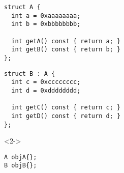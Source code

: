 \begin{frame}[fragile]
\begin{noteblock}{}
\begin{twocols}
\begin{lstlisting}[basicstyle=\scriptsize]
struct A {
  int a = 0xaaaaaaaa;
  int b = 0xbbbbbbbb;

  int getA() const { return a; }
  int getB() const { return b; }
};
\end{lstlisting}
\twocolssep
\begin{lstlisting}[basicstyle=\scriptsize]
struct B : A {
  int c = 0xcccccccc;
  int d = 0xdddddddd;

  int getC() const { return c; }
  int getD() const { return d; }
};
\end{lstlisting}
\end{twocols}
\end{noteblock}


\begin{overlayarea}{\textwidth}{3cm}

\begin{threecols}

\begin{yesblock}<2->
\begin{lstlisting}
A objA{};
B objB{};
\end{lstlisting}
\end{yesblock}

\threecolssep


\end{threecols}
\end{overlayarea}
\end{frame}
